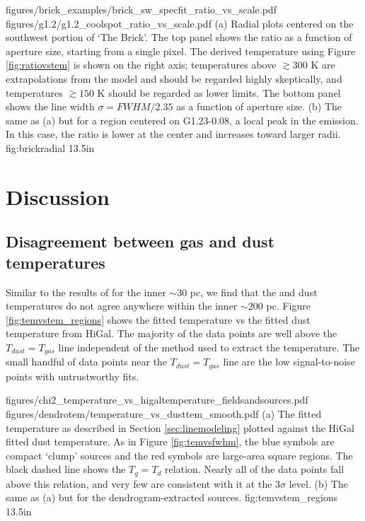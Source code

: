 \FigureTwo
{figures/brick_examples/brick_sw_specfit_ratio_vs_scale.pdf}
{figures/g1.2/g1.2_coolspot_ratio_vs_scale.pdf}
{(a) Radial plots centered on the southwest portion of `The Brick'.
The top panel shows the ratio \Rone as a function of aperture size, starting
from a single pixel.
The derived temperature using Figure \ref{fig:ratiovstem} is shown on the right
axis; temperatures above $\gtrsim300$ K are extrapolations from the model and
should be regarded highly skeptically, and temperatures $\gtrsim150$ K should
be regarded as lower limits.
The bottom panel shows the line width $\sigma = FWHM/2.35$
as a function of aperture size.  
(b) The same as (a) but for a region centered on G1.23-0.08, a local
peak in the \para \threeohthree emission.  In this case,
the ratio \Rone is lower at the center and increases toward larger radii.
}
{fig:brickradial}
{1}{3.5in}



\section{Discussion}
\subsection{Disagreement between gas and dust temperatures}
Similar to the results of \citet{Ao2013a} for the inner $\sim30$ pc, we find
that the \para and dust temperatures do not agree anywhere within the inner
$\sim200$ pc.  Figure \ref{fig:temvstem_regions} shows the fitted \para
temperature vs the fitted dust temperature from HiGal.  The majority of the
\formaldehyde data points are well above the $T_{dust}=T_{gas}$ line
independent of the method used to extract the temperature.  The small handful
of data points near the $T_{dust}=T_{gas}$ line are the low signal-to-noise
points with untrustworthy fits.

\FigureTwo
{figures/chi2_temperature_vs_higaltemperature_fieldsandsources.pdf}
{figures/dendrotem/temperature_vs_dusttem_smooth.pdf} %
{(a) The fitted temperature as described in Section \ref{sec:linemodeling} plotted
against the HiGal fitted dust temperature.  As in Figure \ref{fig:temvsfwhm},
the blue symbols are compact `clump' sources and the red symbols are large-area
square regions.  The black dashed line shows the $T_g = T_d$ relation.  Nearly
all of the data points fall above this relation, and very few are consistent
with it at the 3$\sigma$ level.
(b) The same as (a) but for the dendrogram-extracted sources.
}
{fig:temvstem_regions}
{1}{3.5in}

